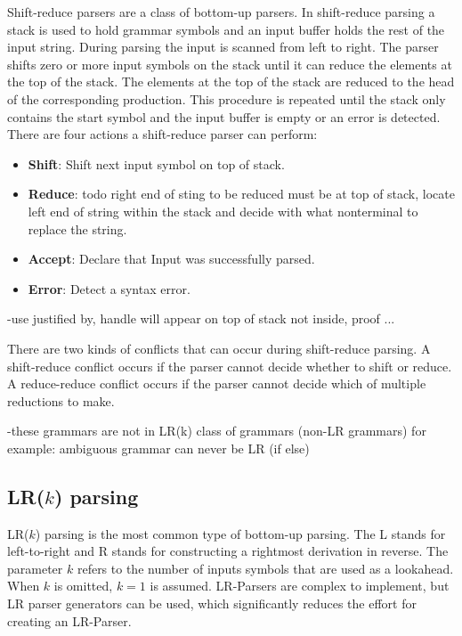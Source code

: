 Shift-reduce parsers are a class of bottom-up parsers. In shift-reduce parsing a stack is used to hold grammar symbols and an input buffer holds the rest of the input string.
During parsing the input is scanned from left to right. The parser shifts zero or more input symbols on the stack until it can reduce the elements at the top of the stack. The elements at the top of the stack are reduced to the head of the corresponding production. This procedure is repeated until the stack only contains the start symbol and the input buffer is empty or an error is detected. \cite{Aho.2007}\\
There are four actions a shift-reduce parser can perform:
\begin{itemize}%
	\item \textbf{Shift}: Shift next input symbol on top of stack.
	\item \textbf{Reduce}: todo right end of sting to be reduced must be at top of stack, locate left end of string within the stack and decide with what nonterminal to replace the string.
	\item \textbf{Accept}: Declare that Input was successfully parsed.
	\item \textbf{Error}: Detect a syntax error.
\end{itemize}
\cite{Aho.2007}

-use justified by, handle will appear on top of stack not inside, proof ...

There are two kinds of conflicts that can occur during shift-reduce parsing. A shift-reduce conflict occurs if the parser cannot decide whether to shift or reduce.
A reduce-reduce conflict occurs if the parser cannot decide which of multiple reductions to make.

-these grammars are not in LR(k) class of grammars (non-LR grammars)
for example: ambiguous grammar can never be LR (if else)
\cite{Aho.2007}

\subsection{LR($k$) parsing}\label{sec:BackgroundParserLR}

LR($k$) parsing is the most common type of bottom-up parsing. The L stands for left-to-right and R stands for constructing a rightmost derivation in reverse. The parameter $k$ refers to the number of inputs symbols that are used as a lookahead. When $k$ is omitted, $k = 1$ is assumed.
LR-Parsers are complex to implement, but LR parser generators can be used, which significantly reduces the effort for creating an LR-Parser.


